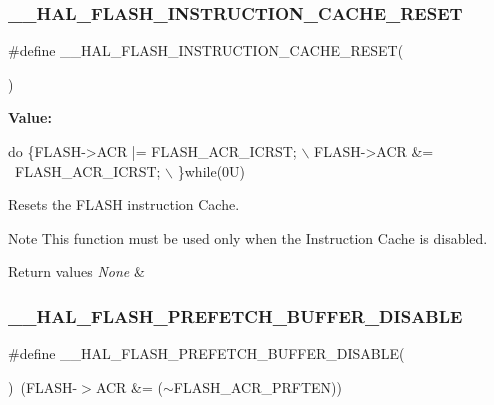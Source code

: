 \subsubsection{\texorpdfstring{\+\_\+\+\_\+\+H\+A\+L\+\_\+\+F\+L\+A\+S\+H\+\_\+\+I\+N\+S\+T\+R\+U\+C\+T\+I\+O\+N\+\_\+\+C\+A\+C\+H\+E\+\_\+\+R\+E\+S\+ET}{\_\_HAL\_FLASH\_INSTRUCTION\_CACHE\_RESET}}
{\footnotesize\ttfamily \#define \+\_\+\+\_\+\+H\+A\+L\+\_\+\+F\+L\+A\+S\+H\+\_\+\+I\+N\+S\+T\+R\+U\+C\+T\+I\+O\+N\+\_\+\+C\+A\+C\+H\+E\+\_\+\+R\+E\+S\+ET(\begin{DoxyParamCaption}{ }\end{DoxyParamCaption})}

{\bfseries Value\+:}
\begin{DoxyCode}
\textcolor{keywordflow}{do} \{FLASH->ACR |= FLASH\_ACR\_ICRST;  \(\backslash\)
                                                  FLASH->ACR &= ~FLASH\_ACR\_ICRST; \(\backslash\)
                                                 \}\textcolor{keywordflow}{while}(0U)
\end{DoxyCode}


Resets the F\+L\+A\+SH instruction Cache. 

\begin{DoxyNote}{Note}
This function must be used only when the Instruction Cache is disabled. ~\newline

\end{DoxyNote}

\begin{DoxyRetVals}{Return values}
{\em None} & \\
\hline
\end{DoxyRetVals}
\mbox{\label{group___f_l_a_s_h___exported___macros_ga646a4cb92e85659334d14a8c78f0ede8}} 
\subsubsection{\texorpdfstring{\+\_\+\+\_\+\+H\+A\+L\+\_\+\+F\+L\+A\+S\+H\+\_\+\+P\+R\+E\+F\+E\+T\+C\+H\+\_\+\+B\+U\+F\+F\+E\+R\+\_\+\+D\+I\+S\+A\+B\+LE}{\_\_HAL\_FLASH\_PREFETCH\_BUFFER\_DISABLE}}
{\footnotesize\ttfamily \#define \+\_\+\+\_\+\+H\+A\+L\+\_\+\+F\+L\+A\+S\+H\+\_\+\+P\+R\+E\+F\+E\+T\+C\+H\+\_\+\+B\+U\+F\+F\+E\+R\+\_\+\+D\+I\+S\+A\+B\+LE(\begin{DoxyParamCaption}{ }\end{DoxyParamCaption})~(F\+L\+A\+SH-\/$>$A\+CR \&= ($\sim$F\+L\+A\+S\+H\+\_\+\+A\+C\+R\+\_\+\+P\+R\+F\+T\+EN))}



